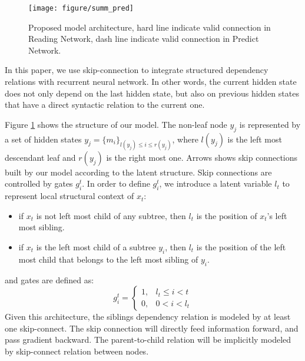 \documentclass{article} \usepackage{iclr2018_conference,times}
\begin{document}
\begin{figure}[h]
  \centering  
  \texttt{[image: figure/summ\_pred]}
  \caption{Proposed model architecture, hard line indicate valid connection in Reading Network, dash line indicate valid connection in Predict Network.}
  \label{fig_summ_pred}
\end{figure}

In this paper, we use skip-connection to integrate structured dependency relations with recurrent neural network. In other words, the current hidden state does not only depend on the last hidden state, but also on previous hidden states that have a direct syntactic relation to the current one.


Figure \ref{fig_summ_pred} shows the structure of our model. The non-leaf node $y_j$ is represented by a set of hidden states $y_j = \{m_i\}_{l(y_j) \leq i \leq r(y_j)}$, where $l(y_j)$ is the left most descendant leaf and $r(y_j)$ is the right most one. Arrows shows skip connections built by our model according to the latent structure. Skip connections are controlled by gates ${g_i^t}$. In order to define $g_i^t$, we introduce a latent variable $l_t$ to represent local structural context of $x_t$:
\begin{itemize}
\item if $x_t$ is not left most child of any subtree, then $l_t$ is the position of $x_t$'s left most sibling.
\item if $x_t$ is the left most child of a subtree $y_i$, then $l_t$ is the position of the left most child that belongs to the left most sibling of $y_i$. 
\end{itemize}
and gates are defined as:
\begin{equation} \label{eq_gt}
g_i^t = \begin{cases} 1, & l_t \le i < t \\ 0, & 0 < i < l_t \end{cases}
\end{equation}
Given this architecture, the siblings dependency relation is modeled by at least one skip-connect. The skip connection will directly feed information forward, and pass gradient backward. The parent-to-child relation will be implicitly modeled by skip-connect relation between nodes.
\end{document}
